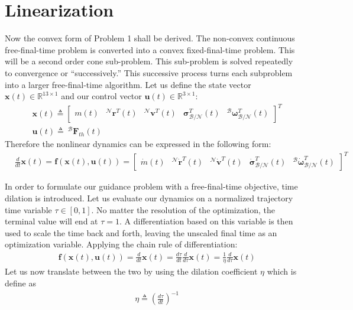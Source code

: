 \documentclass[conf]{new-aiaa}
\begin{document}

\section{Linearization}
Now the convex form of Problem 1 shall be derived. The non-convex continuous free-final-time problem is converted into a convex fixed-final-time problem. This will be a second order cone sub-problem. This sub-problem is solved repeatedly to convergence or ``successively.'' This successive process turns each subproblem into a larger free-final-time algorithm.
Let us define the state vector $\mathbf{x}(t) \in \mathbb{R}^{13\times 1}$ and our control vector $\mathbf{u}(t) \in \mathbb{R}^{3\times 1}$:
\begin{align}
& \mathbf{x}(t) \triangleq 
	\begin{bmatrix}
	m(t) & ^\mathcal{N}\mathbf{r}^T(t) & ^\mathcal{N}\mathbf{v}^T(t) & \boldsymbol{\sigma}_\mathcal{B/N}^T(t) & ^\mathcal{B}\bm{\omega}_\mathcal{B/N}^T(t)   
	\end{bmatrix}^T \\
& \mathbf{u}(t) \triangleq \ ^\mathcal{B}\mathbf{F}_{th}(t)  
\end{align}
Therefore the nonlinear dynamics can be expressed in the following form:
\begin{align}
& \frac{d}{dt}\mathbf{x}(t) = \mathbf{f}(\mathbf{x}(t), \mathbf{u}(t)) =  
	\begin{bmatrix}
	\dot{m}(t) & ^\mathcal{N}\dot{\mathbf{r}}^T(t) & ^\mathcal{N}\dot{\mathbf{v}}^T(t) & \dot{\boldsymbol{\sigma}}_\mathcal{B/N}^T(t) & ^\mathcal{B}\dot{\bm{\omega}}_\mathcal{B/N}^T(t)  
	\end{bmatrix}^T
\end{align}

In order to formulate our guidance problem with a free-final-time objective, time dilation is introduced. Let us evaluate our dynamics on a normalized trajectory time variable $\tau \in [0,1]$. No matter the resolution of the optimization, the terminal value will end at $\tau = 1$. A differentiation based on this variable is then used to scale the time back and forth, leaving the unscaled final time as an optimization variable. Applying the chain rule of differentiation: 
\begin{align}
& \mathbf{f}(\mathbf{x}(t) , \mathbf{u}(t)) =  \frac{d}{dt}\mathbf{x}(t) = \frac{d\tau}{dt} \frac{d}{d\tau}\mathbf{x}(t) =  \frac{1}{\eta}\frac{d}{d\tau}\mathbf{x}(t)
\end{align}
Let us now translate between the two by using the dilation coefficient $\eta$ which is define as
\begin{align}
& \eta \triangleq \left(\frac{d\tau}{dt}\right)^{-1}
\end{align}
\end{document}
